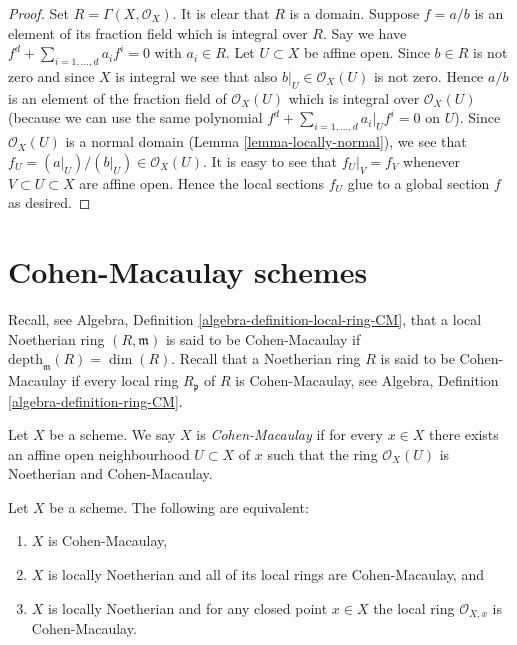 \begin{proof}
Set $R = \Gamma(X, \mathcal{O}_X)$.
It is clear that $R$ is a domain.
Suppose $f = a/b$ is an element of its fraction field
which is integral over $R$. Say we have
$f^d + \sum_{i = 1, \ldots, d} a_i f^i = 0$ with
$a_i \in R$. Let $U \subset X$ be affine open.
Since $b \in R$ is not zero and since $X$ is integral we see
that also $b|_U \in \mathcal{O}_X(U)$ is not zero.
Hence $a/b$ is an element of the fraction field of
$\mathcal{O}_X(U)$ which is integral over $\mathcal{O}_X(U)$
(because we can use the same polynomial
$f^d + \sum_{i = 1, \ldots, d} a_i|_U f^i = 0$ on $U$).
Since $\mathcal{O}_X(U)$ is a normal domain
(Lemma \ref{lemma-locally-normal}), we see that
$f_U = (a|_U)/(b|_U) \in \mathcal{O}_X(U)$. It is easy to
see that $f_U|_V = f_V$ whenever $V \subset U \subset X$ are
affine open. Hence the local sections $f_U$ glue to a global
section $f$ as desired.
\end{proof}










\section{Cohen-Macaulay schemes}
\label{section-Cohen-Macaulay}

\noindent
Recall, see Algebra, Definition \ref{algebra-definition-local-ring-CM},
that a local Noetherian ring $(R, \mathfrak m)$ is
said to be Cohen-Macaulay if $\text{depth}_{\mathfrak m}(R) = \dim(R)$.
Recall that a Noetherian ring $R$ is said to be Cohen-Macaulay if
every local ring $R_{\mathfrak p}$ of $R$ is Cohen-Macaulay,
see Algebra, Definition \ref{algebra-definition-ring-CM}.

\begin{definition}
\label{definition-Cohen-Macaulay}
Let $X$ be a scheme. We say $X$ is {\it Cohen-Macaulay} if
for every $x \in X$ there exists an affine open neighbourhood
$U \subset X$ of $x$ such that the ring $\mathcal{O}_X(U)$ is
Noetherian and Cohen-Macaulay.
\end{definition}

\begin{lemma}
\label{lemma-characterize-Cohen-Macaulay}
Let $X$ be a scheme. The following are equivalent:
\begin{enumerate}
\item $X$ is Cohen-Macaulay,
\item $X$ is locally Noetherian and all of its local rings are Cohen-Macaulay,
and
\item $X$ is locally Noetherian and for any closed point $x \in X$
the local ring $\mathcal{O}_{X, x}$ is Cohen-Macaulay.
\end{enumerate}
\end{lemma}

